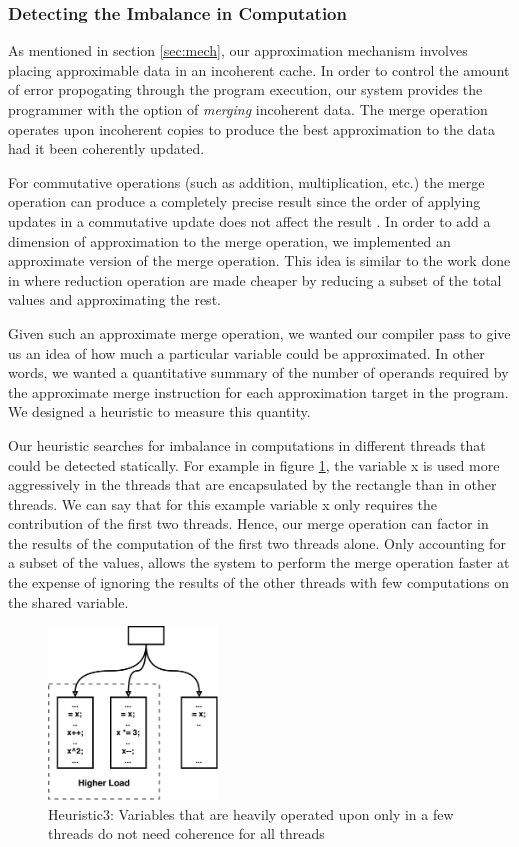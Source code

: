 \documentclass[12pt,conference]{IEEEtran}
\begin{document}
\subsubsection{Detecting the Imbalance in Computation} \label{sec:h3}
As mentioned in section \ref{sec:mech}, our approximation mechanism involves placing
approximable data in an incoherent cache. In order to control the amount of 
error propogating through the program execution, our system provides the programmer 
with the option of \emph{merging} incoherent data. The merge operation operates upon
incoherent copies to produce the best approximation to the data had it been coherently
updated. 

For commutative operations (such as addition, multiplication, etc.) the merge operation 
can produce a completely precise result since the order of applying updates in a commutative 
update does not affect the result \cite{coup}. In order to add a dimension of approximation to
the merge operation, we implemented an approximate version of the merge operation. This idea is 
similar to the work done in \cite{paraprox} where reduction operation are made cheaper by 
reducing a subset of the total values and approximating the rest. 

Given such an approximate merge operation, we wanted our compiler pass to give us 
an idea of how much a particular variable could be approximated. In other words, we 
wanted a quantitative summary of the number of operands required by the approximate 
merge instruction for each approximation target in the program. We designed a heuristic 
to measure this quantity.

Our heuristic searches for imbalance in computations in different threads that could be
detected statically. For example in figure \ref{fig:h3}, the variable x is used more 
aggressively in the threads that are encapsulated by the rectangle than in other threads.
We can say that for this example variable x only requires the contribution of the first
two threads. Hence, our merge operation can factor in the results of the computation of
the first two threads alone. Only accounting for a subset of the values, allows the 
system to perform the merge operation faster at the expense of ignoring the results
of the other threads with few computations on the shared variable. 
\begin{figure}[h]
    \centering
    \includegraphics[width=0.40\textwidth]{Heuristic3.pdf}
    \caption{Heuristic3: Variables that are heavily operated upon only in a few threads do not need coherence for all threads}
    \label{fig:h3}
\end{figure}
\end{document}
